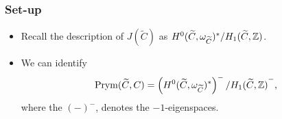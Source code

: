 \begin{frame}
\frametitle{Set-up}

\begin{itemize}
	\item Recall the description of $J(\widetilde C)$ as $H^0(\widetilde C, \omega_{\widetilde C})^\ast/H_1(\widetilde C, \mathbb{Z})$.
	\item We can identify
	\alert{
	\[
	\operatorname{Prym}(\widetilde C, C) = \left(H^0(\widetilde C, \omega_{\widetilde C})^\ast\right)^- /{H_1(\widetilde C, \mathbb{Z})}^-,
	\]
	}
	where the $(-)^-$, denotes the $-1$-eigenspaces.
\end{itemize}



\end{frame}


    \begin{frame}[plain]
     \end{frame}

